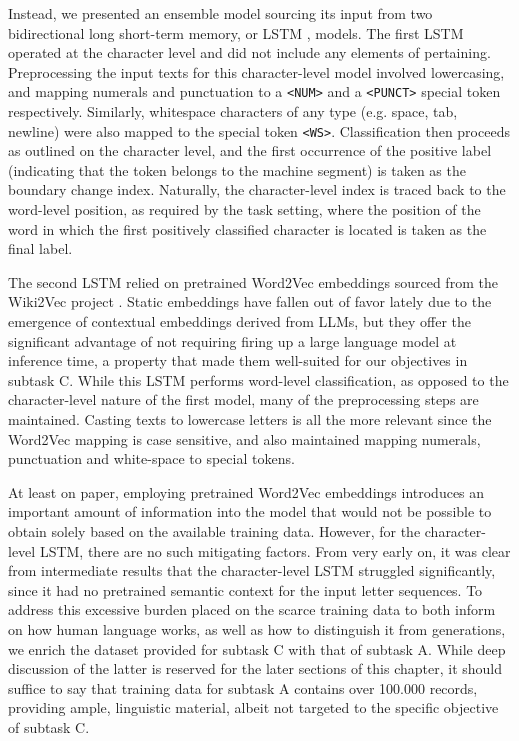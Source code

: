 Instead, we presented an ensemble model sourcing its input from two bidirectional long short-term memory, or LSTM \citep{hochreiter1997long}, models.
The first LSTM operated at the character level and did not include any elements of pertaining.
Preprocessing the input texts for this character-level model involved lowercasing, and mapping numerals and punctuation to a \verb|<NUM>| and a \verb|<PUNCT>| special token respectively.
Similarly, whitespace characters of any type (e.g. space, tab, newline) were also mapped to the special token \verb|<WS>|.
Classification then proceeds as outlined on the character level, and the first occurrence of the positive label (indicating that the token belongs to the machine segment) is taken as the boundary change index.
Naturally, the character-level index is traced back to the word-level position, as required by the task setting, where the position of the word in which the first positively classified character is located is taken as the final label.

The second LSTM relied on pretrained Word2Vec \citep{mikolov2013efficientestimationwordrepresentations} embeddings sourced from the Wiki2Vec project \citep{yamada2020wikipedia2vec}. Static embeddings have fallen out of favor lately due to the emergence of contextual embeddings derived from LLMs, but they offer the significant advantage of not requiring firing up a large language model at inference time, a property that made them well-suited for our objectives in subtask C.
While this LSTM performs word-level classification, as opposed to the character-level nature of the first model, many of the preprocessing steps are maintained.
Casting texts to lowercase letters is all the more relevant since the Word2Vec mapping is case sensitive, and also maintained mapping numerals, punctuation and white-space to special tokens.

At least on paper, employing pretrained Word2Vec embeddings introduces an important amount of information into the model that would not be possible to obtain solely based on the available training data.
However, for the character-level LSTM, there are no such mitigating factors.
From very early on, it was clear from intermediate results that the character-level LSTM struggled significantly, since it had no pretrained semantic context for the input letter sequences.
To address this excessive burden placed on the scarce training data to both inform on how human language works, as well as how to distinguish it from generations, we enrich the dataset provided for subtask C with that of subtask A.
While deep discussion of the latter is reserved for the later sections of this chapter, it should suffice to say that training data for subtask A contains over 100.000 records, providing ample, linguistic material, albeit not targeted to the specific objective of subtask C.

